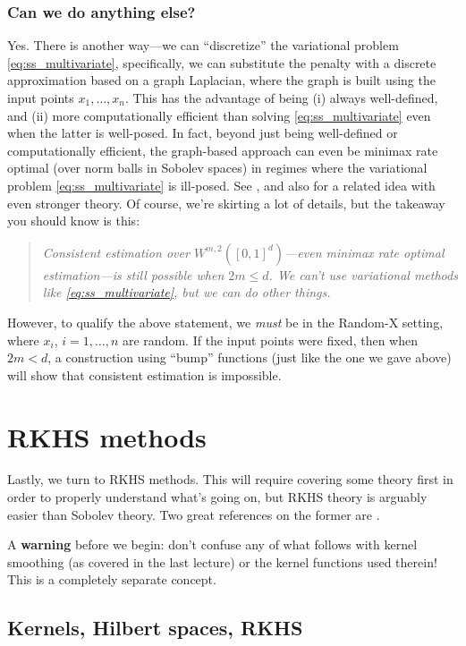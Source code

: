 \documentclass{article}
\begin{document}
\subsubsection{Can we do anything else?}

Yes. There is another way---we can ``discretize'' the variational problem 
\eqref{eq:ss_multivariate}, specifically, we can substitute the penalty with a
discrete approximation based on a graph Laplacian, where the graph is built 
using the input points $x_1,\dots,x_n$. This has the advantage of being (i)
always well-defined, and (ii) more computationally efficient than solving
\eqref{eq:ss_multivariate} even when the latter is well-posed. In fact, beyond
just being well-defined or computationally efficient, the graph-based approach
can even be minimax rate optimal (over norm balls in Sobolev spaces) in regimes
where the variational problem \eqref{eq:ss_multivariate} is ill-posed. See
\citet{green2021minimax}, and also \citet{green2023minimax} for a related idea
with even stronger theory. Of course, we're skirting a lot of details, but the
takeaway you should know is this:    
\begin{quote}
\centering\it
Consistent estimation over $W^{m,2}([0,1]^d)$---even minimax rate optimal
estimation---is still possible when $2m \leq d$. We can't use variational
methods like \eqref{eq:ss_multivariate}, but we can do other things.
\end{quote}
However, to qualify the above statement, we \emph{must} be in the Random-X
setting, where $x_i$, $i=1,\dots,n$ are random. If the input points were fixed,
then when $2m < d$, a construction using ``bump'' functions (just like the
one we gave above) will show that consistent estimation is impossible. 

\section{RKHS methods}

Lastly, we turn to RKHS methods. This will require covering some theory first in
order to properly understand what's going on, but RKHS theory is arguably easier
than Sobolev theory. Two great references on the former are
\citet{scholkopf2002learning, christmann2008support}.  

A \textbf{warning} before we begin: don't confuse any of what follows with
kernel smoothing (as covered in the last lecture) or the kernel functions used
therein! This is a completely separate concept. 

\subsection{Kernels, Hilbert spaces, RKHS}
\end{document}
